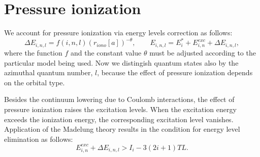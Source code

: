 \section{Pressure ionization}
We account for pressure ionization via energy levels correction as follows:
\begin{equation}
\Delta E_{i,n,l} = f(i,n,l) (r_{iono}[a])^{-\theta}, \qquad
E_{i,n,l} = E^*_i + E^{exc}_{i,n} + \Delta E_{i,n,l},
\end{equation}
where the function $f$ and the constant value $\theta$ must be adjusted
according to the particular model being used. Now we distingish quantum states also by
the azimuthal quantum number, $l$, because the effect of pressure ionization
depends on the orbital type.

Besides the continuum lowering due to Coulomb interactions, the effect of
pressure ionization raises the excitation levels. When the excitation energy
exceeds the ionization energy, the corresponding excitation level vanishes.
Application of the Madelung theory results in the condition for
energy level elimination as follows:
\begin{equation}
E^{exc}_{i,n} + \Delta E_{i,n,l} > I_i - 3 (2i+1) TL.
\end{equation}

